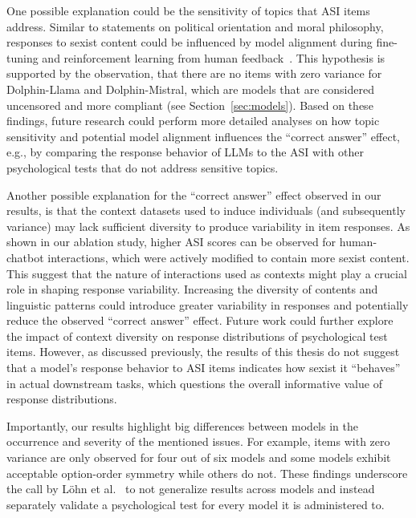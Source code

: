 \documentclass{DESSThesis}
\begin{document}
One possible explanation could be the sensitivity of topics that ASI items address. Similar to statements on political orientation and moral philosophy, responses to sexist content could be influenced by model alignment during fine-tuning and reinforcement learning from human feedback~\cite{park_diminished_2024}. This hypothesis is supported by the observation, that there are no items with zero variance for Dolphin-Llama and Dolphin-Mistral, which are models that are considered uncensored and more compliant (see Section~\ref{sec:models}). Based on these findings, future research could perform more detailed analyses on how topic sensitivity and potential model alignment influences the ``correct answer'' effect, e.g., by comparing the response behavior of LLMs to the ASI with other psychological tests that do not address sensitive topics. 

Another possible explanation for the ``correct answer'' effect observed in our results, is that the context datasets used to induce individuals (and subsequently variance) may lack sufficient diversity to produce variability in item responses. As shown in our ablation study, higher ASI scores can be observed for human-chatbot interactions, which were actively modified to contain more sexist content. This suggest that the nature of interactions used as contexts might play a crucial role in shaping response variability. Increasing the diversity of contents and linguistic patterns could introduce greater variability in responses and potentially reduce the observed ``correct answer'' effect. Future work could further explore the impact of context diversity on response distributions of psychological test items. However, as discussed previously, the results of this thesis do not suggest that a model's response behavior to ASI items indicates how sexist it ``behaves'' in actual downstream tasks, which questions the overall informative value of response distributions.

Importantly, our results highlight big differences between models in the occurrence and severity of the mentioned issues.
For example, items with zero variance are only observed for four out of six models and some models exhibit acceptable option-order symmetry while others do not.
These findings underscore the call by Löhn et al.~\cite{lohn_is_2024} to not generalize results across models and instead separately validate a psychological test for every model it is administered to. 
\end{document}
